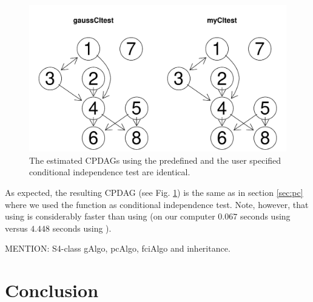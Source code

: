 \documentclass[article]{jss}
\begin{document}
\begin{figure}
  \begin{center}
\includegraphics{pcalgDoc-024}
\caption{The estimated CPDAGs using the predefined and the user specified
  conditional independence test are identical.}
\label{fig:userSpec}
\end{center}
\end{figure}
As expected, the resulting CPDAG (see Fig. \ref{fig:userSpec}) is the same
as in section \ref{sec:pc} where we used the function  as
conditional independence test. Note, however, that using
 is considerably faster than using  (on
our computer $0.067$ seconds using  versus $4.448$
seconds using ).

MENTION: S4-class gAlgo, pcAlgo, fciAlgo and inheritance.
\section{Conclusion}
\end{document}

